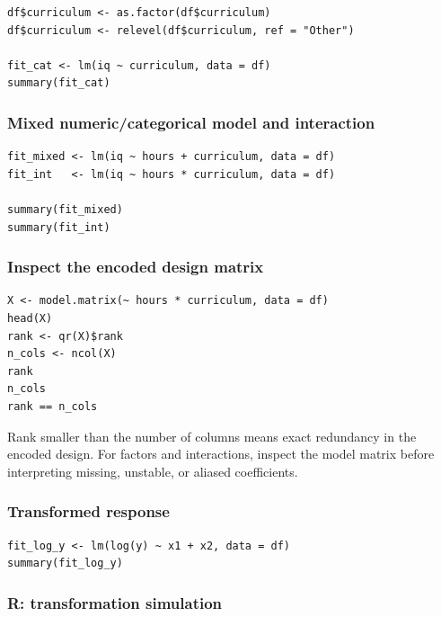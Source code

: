 \begin{verbatim}
df$curriculum <- as.factor(df$curriculum)
df$curriculum <- relevel(df$curriculum, ref = "Other")

fit_cat <- lm(iq ~ curriculum, data = df)
summary(fit_cat)
\end{verbatim}

\subsubsection*{Mixed numeric/categorical model and interaction}

\begin{verbatim}
fit_mixed <- lm(iq ~ hours + curriculum, data = df)
fit_int   <- lm(iq ~ hours * curriculum, data = df)

summary(fit_mixed)
summary(fit_int)
\end{verbatim}

\subsubsection*{Inspect the encoded design matrix}

\begin{verbatim}
X <- model.matrix(~ hours * curriculum, data = df)
head(X)
rank <- qr(X)$rank
n_cols <- ncol(X)
rank
n_cols
rank == n_cols
\end{verbatim}

Rank smaller than the number of columns means exact redundancy in the encoded design.  For factors and interactions, inspect the model matrix before interpreting missing, unstable, or aliased coefficients.

\subsubsection*{Transformed response}

\begin{verbatim}
fit_log_y <- lm(log(y) ~ x1 + x2, data = df)
summary(fit_log_y)
\end{verbatim}

\subsubsection*{R: transformation simulation}

